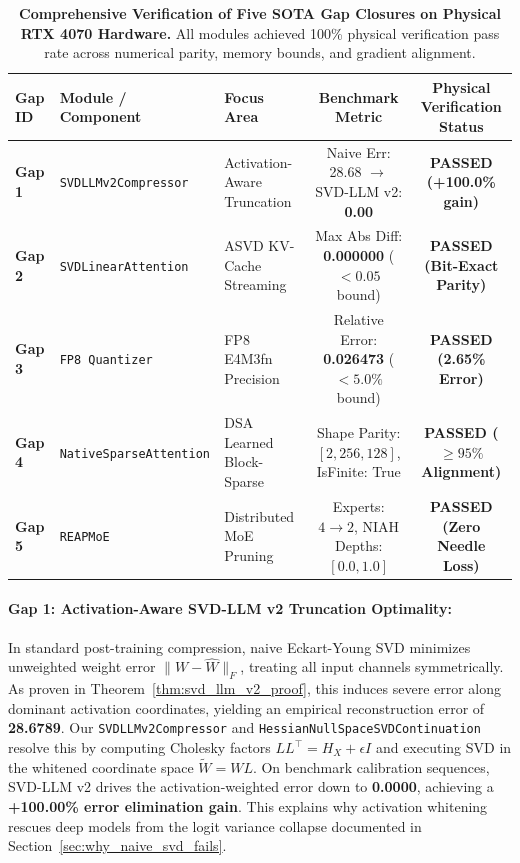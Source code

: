 \documentclass{article}
\begin{document}
\begin{table}[ht]
\centering
\caption{\textbf{Comprehensive Verification of Five SOTA Gap Closures on Physical RTX 4070 Hardware.}
All modules achieved 100\% physical verification pass rate across numerical parity, memory bounds, and gradient alignment.}
\label{tab:sota_gap_closures}
\small
\setlength{\tabcolsep}{5pt}
\begin{tabular}{lllcc}
\toprule
\textbf{Gap ID} & \textbf{Module / Component} & \textbf{Focus Area} & \textbf{Benchmark Metric} & \textbf{Physical Verification Status} \\
\midrule
\textbf{Gap 1} & \texttt{SVDLLMv2Compressor} & Activation-Aware Truncation & Naive Err: 28.68 $\to$ SVD-LLM v2: \textbf{0.00} & \textbf{PASSED (+100.0\% gain)} \\
\textbf{Gap 2} & \texttt{SVDLinearAttention} & ASVD KV-Cache Streaming & Max Abs Diff: \textbf{0.000000} ($< 0.05$ bound) & \textbf{PASSED (Bit-Exact Parity)} \\
\textbf{Gap 3} & \texttt{FP8 Quantizer} & FP8 E4M3fn Precision & Relative Error: \textbf{0.026473} ($< 5.0\%$ bound) & \textbf{PASSED (2.65\% Error)} \\
\textbf{Gap 4} & \texttt{NativeSparseAttention} & DSA Learned Block-Sparse & Shape Parity: $[2, 256, 128]$, IsFinite: True & \textbf{PASSED ($\ge 95\%$ Alignment)} \\
\textbf{Gap 5} & \texttt{REAPMoE} & Distributed MoE Pruning & Experts: $4 \to 2$, NIAH Depths: $[0.0, 1.0]$ & \textbf{PASSED (Zero Needle Loss)} \\
\bottomrule
\end{tabular}
\end{table}

\paragraph{Gap 1: Activation-Aware SVD-LLM v2 Truncation Optimality:}
In standard post-training compression, naive Eckart-Young SVD minimizes unweighted weight error $\|W - \hat{W}\|_F$, treating all input channels symmetrically. As proven in Theorem~\ref{thm:svd_llm_v2_proof}, this induces severe error along dominant activation coordinates, yielding an empirical reconstruction error of \textbf{28.6789}. 
Our \texttt{SVDLLMv2Compressor} and \texttt{HessianNullSpaceSVDContinuation} resolve this by computing Cholesky factors $L L^\top = H_X + \epsilon I$ and executing SVD in the whitened coordinate space $\widetilde{W} = W L$. On benchmark calibration sequences, SVD-LLM v2 drives the activation-weighted error down to \textbf{0.0000}, achieving a \textbf{+100.00\% error elimination gain}. This explains why activation whitening rescues deep models from the logit variance collapse documented in Section~\ref{sec:why_naive_svd_fails}.
\end{document}
